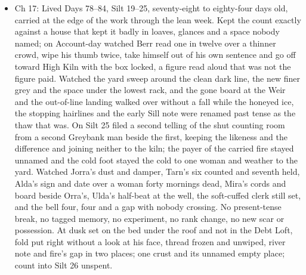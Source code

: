 \documentclass{design/chronicle}
\begin{document}
{\begin{itemize}[leftmargin=1.4em,itemsep=1pt,topsep=3pt,parsep=0pt]
\item Ch 17: Lived Days 78–84, Silt 19–25, seventy-eight to eighty-four days old, carried at the edge of the work through the lean week. Kept the count exactly against a house that kept it badly in loaves, glances and a space nobody named; on Account-day watched Berr read one in twelve over a thinner crowd, wipe his thumb twice, take himself out of his own sentence and go off toward High Kiln with the box locked, a figure read aloud that was not the figure paid. Watched the yard sweep around the clean dark line, the new finer grey and the space under the lowest rack, and the gone board at the Weir and the out-of-line landing walked over without a fall while the honeyed ice, the stopping hairlines and the early Sill note were renamed past tense as the thaw that was. On Silt 25 filed a second telling of the shut counting room from a second Greybank man beside the first, keeping the likeness and the difference and joining neither to the kiln; the payer of the carried fire stayed unnamed and the cold foot stayed the cold to one woman and weather to the yard. Watched Jorra’s dust and damper, Tarn’s six counted and seventh held, Alda’s sign and date over a woman forty mornings dead, Mira’s cords and board beside Orra’s, Ulda’s half-beat at the well, the soft-cuffed clerk still set, and the bell four, four and a gap with nobody crossing. No present-tense break, no tagged memory, no experiment, no rank change, no new scar or possession. At dusk set on the bed under the roof and not in the Debt Loft, fold put right without a look at his face, thread frozen and unwiped, river note and fire’s gap in two places; one crust and its unnamed empty place; count into Silt 26 unspent.

\end{itemize}

\begin{itemize}[leftmargin=1.4em,itemsep=1pt,topsep=3pt,parsep=0pt]


\end{itemize}}
\end{document}
